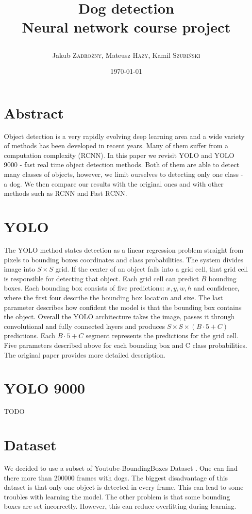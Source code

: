 \documentclass{article}
\title
{
	\LARGE\textbf{Dog detection} \\ 
	Neural network course project \\
	\author
	{ 
		Jakub \textsc{Zadrożny}, 
		Mateusz \textsc{Hazy},
		Kamil \textsc{Szubiński}
	}
}
\date{\today}
\begin{document}
\maketitle

\section*{Abstract}

Object detection is a very rapidly evolving deep learning area and a wide variety of methods has been developed in recent years. Many of them suffer from a computation complexity (RCNN). In this paper we revisit YOLO \cite{yolo} and YOLO 9000 \cite{yolo9000} - fast real time object detection methods. Both of them are able to detect many classes of objects, however, we limit ourselves to detecting only one class - a dog. We then compare our results with the original ones and with other methods such as RCNN and Fast RCNN.

\section*{YOLO}

The YOLO method states detection as a linear regression problem straight from pixels to bounding boxes coordinates and class probabilities. The system divides image into $ S \times S $ grid. If the center of an object falls into a grid cell, that grid cell is responsible for detecting that object. Each grid cell can predict $B$ bounding boxes. Each bounding box consists of five predictions: $x, y, w, h$ and confidence, where the first four describe the bounding box location and size. The last parameter describes how confident the model is that the bounding box contains the object. Overall the YOLO architecture takes the image, passes it through convolutional and fully connected layers and produces $S \times S \times (B \cdot  5 + C)$ predictions. Each $B \cdot 5 + C$ segment represents the predictions for the grid cell. Five parameters described above for each bounding box and C class probabilities. The original paper \cite{yolo} provides more detailed description.
\section*{YOLO 9000}

TODO 

\section*{Dataset}
We decided to use a subset of Youtube-BoundingBoxes Dataset \cite{youtube-bb}. One can find there more than 200000 frames with dogs. The biggest disadvantage of this dataset is that only one object is detected in every frame. This can lead to some troubles with learning the model. The other problem is that some bounding boxes are set incorrectly. However, this can reduce overfitting during learning.
\end{document}
